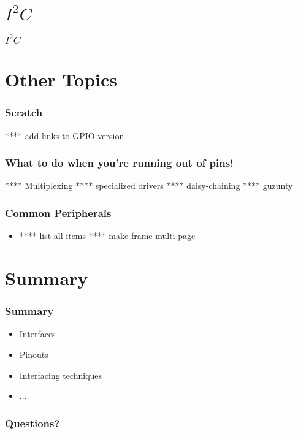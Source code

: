 \documentclass[slidestop,usepdftitle=false,14pt,table]{beamer}
\begin{document}
\section{$I^2C$}
\begin{frame}
\frametitle{$I^2C$}


\end{frame}




\section{Other Topics}
\begin{frame}
\frametitle{Scratch}
**** add links to GPIO version
\end{frame}

\begin{frame}
\frametitle{What to do when you're running out of pins!}
**** Multiplexing
**** specialized drivers
**** daisy-chaining
**** guzunty
\end{frame}

\begin{frame}
\frametitle{Common Peripherals}
\begin{itemize}
\item **** list all items **** make frame multi-page
\end{itemize}
\end{frame}

\section{Summary}
\begin{frame}
  \frametitle{Summary}
  \begin{itemize}
  \item Interfaces
  \item Pinouts
  \item Interfacing techniques
  \item ...
  \end{itemize}
\end{frame}

{
\begin{frame}
  \frametitle{Questions?}
  \centerslidestrue
\end{frame}
}

\end{document}
